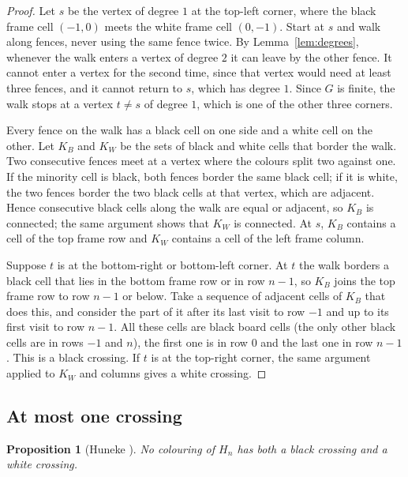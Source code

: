 \documentclass[11pt,a4paper]{amsart}
\newtheorem{proposition}[theorem]{Proposition}
\theoremstyle{definition}
\theoremstyle{remark}
\begin{document}
\begin{proof}
Let $s$ be the vertex of degree $1$ at the top-left corner, where the black frame cell $(-1,0)$ meets the white frame cell $(0,-1)$. Start at $s$ and walk along fences, never using the same fence twice. By Lemma~\ref{lem:degrees}, whenever the walk enters a vertex of degree $2$ it can leave by the other fence. It cannot enter a vertex for the second time, since that vertex would need at least three fences, and it cannot return to $s$, which has degree $1$. Since $G$ is finite, the walk stops at a vertex $t \ne s$ of degree $1$, which is one of the other three corners.

Every fence on the walk has a black cell on one side and a white cell on the other. Let $K_B$ and $K_W$ be the sets of black and white cells that border the walk. Two consecutive fences meet at a vertex where the colours split two against one. If the minority cell is black, both fences border the same black cell; if it is white, the two fences border the two black cells at that vertex, which are adjacent. Hence consecutive black cells along the walk are equal or adjacent, so $K_B$ is connected; the same argument shows that $K_W$ is connected. At $s$, $K_B$ contains a cell of the top frame row and $K_W$ contains a cell of the left frame column.

Suppose $t$ is at the bottom-right or bottom-left corner. At $t$ the walk borders a black cell that lies in the bottom frame row or in row $n-1$, so $K_B$ joins the top frame row to row $n-1$ or below. Take a sequence of adjacent cells of $K_B$ that does this, and consider the part of it after its last visit to row $-1$ and up to its first visit to row $n-1$. All these cells are black board cells (the only other black cells are in rows $-1$ and $n$), the first one is in row $0$ and the last one in row $n-1$. This is a black crossing. If $t$ is at the top-right corner, the same argument applied to $K_W$ and columns gives a white crossing.
\end{proof}

\subsection{At most one crossing}

\begin{proposition}[Huneke \cite{huneke}]\label{prop:uniqueness}
No colouring of $H_n$ has both a black crossing and a white crossing.
\end{proposition}
\end{document}
